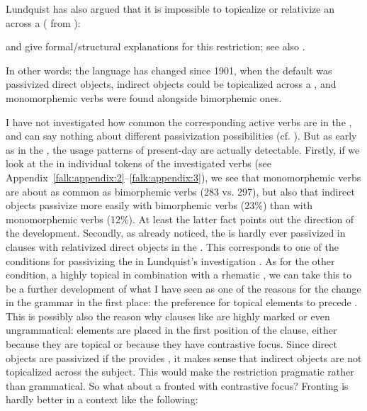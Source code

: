 \documentclass[output=paper]{langscibook}
\begin{document}
Lundquist has also argued that it is impossible to topicalize or relativize an  across a  ( from \citealt{Lundquist2004}):


\ea%
    \label{ex:falk:27}
\z
\z

\citet{HolmbergEtAl2019} and \citet{Platzack2006} give formal/structural explanations for this restriction; see also \citet{Lundquist2015}. 


In other words: the language has changed since 1901, when the default was passivized direct objects, indirect objects could be topicalized across a , and monomorphemic  verbs were found alongside bimorphemic ones.



I have not investigated how common the corresponding active  verbs are in the , and can say nothing about different passivization possibilities (cf. \citealt{HaddicanHolmberg2019}). But as early as in the , the usage patterns of present-day  are actually detectable. Firstly, if we look at the  in individual tokens of the investigated verbs (see Appendix~\ref{falk:appendix:2}--\ref{falk:appendix:3}), we see that monomorphemic verbs are about as common as bimorphemic verbs (283 vs. 297), but also that indirect objects passivize more easily with bimorphemic verbs (23\%) than with monomorphemic verbs (12\%). At least the latter fact points out the direction of the development. Secondly, as already noticed, the  is hardly ever passivized in clauses with relativized direct objects in the . This corresponds to one of the conditions for passivizing the  in Lundquist’s investigation \parencite{Lundquist2004}. As for the other condition, a highly topical  in combination with a rhematic , we can take this to be a further development of what I have seen as one of the reasons for the change in the grammar in the first place: the preference for topical elements to precede . This is possibly also the reason why clauses like  are highly marked or even ungrammatical: elements are placed in the first position of the clause, either because they are topical or because they have contrastive focus. Since direct objects are passivized if the  provides , it makes sense that indirect objects are not topicalized across the subject. This would make the restriction pragmatic rather than grammatical. So what about a fronted  with contrastive focus? Fronting is hardly better in a context like the following:
\end{document}

